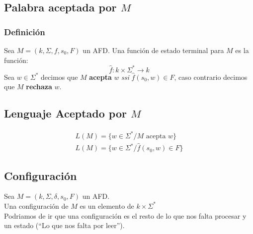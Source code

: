 \subsection{Palabra aceptada por $M$}
\subsubsection{Definición}
Sea $M=(k,\Sigma,f,s_0,F)$ un AFD. Una función de estado terminal para $M$ es la función:
$$
	\hat{f}: k \times \Sigma^* \rightarrow k
$$
Sea $w\in\Sigma^*$ decimos que $M$ \textbf{acepta} $w$ \textit{ssi} $\hat{f}(s_0,w)\in F$, caso contrario decimos que $M$ \textbf{rechaza} $w$.
\subsection{Lenguaje Aceptado por $M$}
\begin{align*}
L(M) = \{ w\in\Sigma^*  / M \text{ acepta } w\} \\
L(M) = \{ w\in\Sigma^* / \hat{f}(s_0,w)\in F \}
\end{align*}
\subsection{Configuración}
Sea $M=(k,\Sigma,\delta,s_0,F)$ un AFD. \\ $ { } $ \\ 
Una configuración de $M$ es un elemento de $k\times\Sigma^*$ \\
Podriamos de ir que una configuración es el resto de lo que nos falta procesar y un estado (``Lo que nos falta por leer'').
